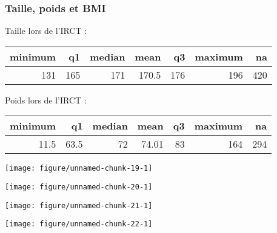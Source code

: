 \documentclass[11pt,a4paper]{article}\usepackage[]{graphicx}\usepackage[]{color}
\makeatletter
\def\maxwidth{ %
  \ifdim\Gin@nat@width>\linewidth
    \linewidth
  \else
    \Gin@nat@width
  \fi
}
\newenvironment{knitrout}{}{} %
\makeatother
\begin{document}
    \subsubsection{Taille, poids et BMI}
  
Taille lors de l'IRCT :
  
\begin{table}[ht]
\centering
\begin{tabular}{rrrrrrr}
  \hline
minimum & q1 & median & mean & q3 & maximum & na \\ 
  \hline
131 & 165 & 171 & 170.5 & 176 & 196 & 420 \\ 
   \hline
\end{tabular}
\end{table}


Poids lors de l'IRCT :

\begin{table}[ht]
\centering
\begin{tabular}{rrrrrrr}
  \hline
minimum & q1 & median & mean & q3 & maximum & na \\ 
  \hline
11.5 & 63.5 & 72 & 74.01 & 83 & 164 & 294 \\ 
   \hline
\end{tabular}
\end{table}


\begin{knitrout}
\color{fgcolor}
\texttt{[image: figure/unnamed-chunk-19-1]} 

\end{knitrout}

\begin{knitrout}
\color{fgcolor}
\texttt{[image: figure/unnamed-chunk-20-1]} 

\end{knitrout}

\begin{knitrout}
\color{fgcolor}
\texttt{[image: figure/unnamed-chunk-21-1]} 

\end{knitrout}

\begin{knitrout}
\color{fgcolor}
\texttt{[image: figure/unnamed-chunk-22-1]} 

\end{knitrout}
\end{document}

